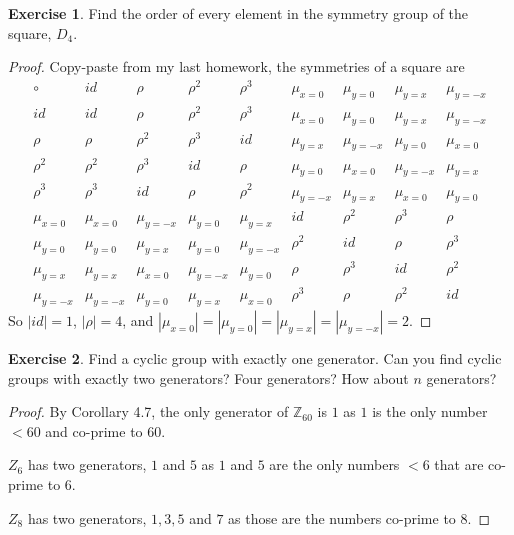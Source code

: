 \documentclass{article}
\theoremstyle{definition}
\newtheorem{theorem}{Exercise}[section]
\newcommand{\Z}{\mathbb{Z}}
\begin{document}
	\setcounter{theorem}{5}
	\begin{theorem}
		Find the order of every element in the symmetry group of the square, $D_4$. 
	\end{theorem}
	\begin{proof}
		Copy-paste from my last homework, the symmetries of a square are $$\begin{array}{c|cccccccc}
		\circ & id & \rho & \rho^2 & \rho^3 & \mu_{x=0} & \mu_{y=0} & \mu_{y=x} & \mu_{y=-x} \\ \hline
		id & id & \rho & \rho^2 & \rho^3 & \mu_{x=0} & \mu_{y=0} & \mu_{y=x} & \mu_{y=-x} \\ 
		\rho & \rho &  \rho^2&  \rho^3&  id&  \mu_{y=x}&  \mu_{y=-x}&  \mu_{y=0}&  \mu_{x=0}\\ 
		\rho^2&  \rho^2&  \rho^3&  id&  \rho&  \mu_{y=0}&  \mu_{x=0}&  \mu_{y=-x}&  \mu_{y=x}\\ 
		\rho^3&  \rho^3&  id&  \rho&  \rho^2&  \mu_{y=-x}&  \mu_{y=x}&  \mu_{x=0}&  \mu_{y=0}\\ 
		\mu_{x=0}&  \mu_{x=0}&  \mu_{y=-x}&  \mu_{y=0}&  \mu_{y=x}&  id&  \rho^2&  \rho^3&  \rho\\ 
		\mu_{y=0}&  \mu_{y=0}&  \mu_{y=x}&  \mu_{y=0}&  \mu_{y=-x}&  \rho^2&  id&  \rho&  \rho^3\\ 
		\mu_{y=x}&  \mu_{y=x}&  \mu_{x=0}&  \mu_{y=-x}&  \mu_{y=0}&  \rho&  \rho^3&  id&  \rho^2\\ 
		\mu_{y=-x}&  \mu_{y=-x}&  \mu_{y=0}&  \mu_{y=x}&  \mu_{x=0}&  \rho^3&  \rho&  \rho^2&  id 
		\end{array} $$ 
		So $|id|=1$, $|\rho|=4$, and $|\mu_{x=0}|=|\mu_{y=0}|=|\mu_{y=x}|=|\mu_{y=-x}|=2$. 
	\end{proof}


	\setcounter{theorem}{11}
	\begin{theorem}
		Find a cyclic group with exactly one generator. Can you find cyclic groups with exactly two generators? Four generators? How about $n$ generators? 
	\end{theorem}
	\begin{proof}
		By Corollary 4.7, the only generator of $\Z_{60}$ is $1$ as $1$ is the only number $<60$ and co-prime to $60$. 
		
		$Z_6$ has two generators, $1$ and $5$ as $1$ and $5$ are the only numbers $<6$ that are co-prime to $6$. 
		
		$Z_8$ has two generators, $1, 3, 5$ and $7$ as those are the numbers co-prime to $8$. 
	\end{proof}



	
	
	
	
\end{document}

